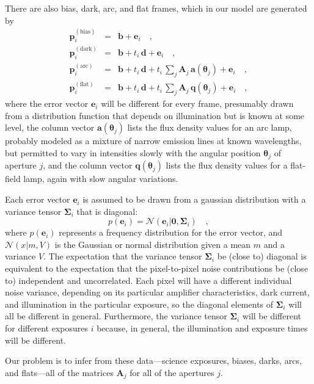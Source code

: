 \documentclass[12pt]{article}
\newcommand{\hmatrix}[1]{\boldsymbol{#1}}
\newcommand{\Amatrix}{\hmatrix{A}}
\newcommand{\zero}{\hmatrix{0}}
\newcommand{\biaspixels}{\hmatrix{p}^\mathrm{(bias)}}
\newcommand{\darkpixels}{\hmatrix{p}^\mathrm{(dark)}}
\newcommand{\arcpixels}{\hmatrix{p}^\mathrm{(arc)}}
\newcommand{\flatpixels}{\hmatrix{p}^\mathrm{(flat)}}
\newcommand{\bias}{\hmatrix{b}}
\newcommand{\dark}{\hmatrix{d}}
\newcommand{\arc}{\hmatrix{a}}
\newcommand{\lamp}{\hmatrix{q}}
\renewcommand{\angle}{\hmatrix{\theta}}
\newcommand{\error}{\hmatrix{e}}
\newcommand{\pixelvariance}{\hmatrix{\Sigma}}
\newcommand{\Normal}{\mathscr{N}}
\newcommand{\exptime}{t}
\begin{document}
There are also bias, dark, arc, and flat frames, which in our model
are generated by
\begin{eqnarray}\displaystyle
\biaspixels_i & = & \bias 
                + \error_i \quad ,\\
\darkpixels_i & = & \bias + \exptime_i\,\dark
                + \error_i \quad ,\\
\arcpixels_i  & = & \bias + \exptime_i\,\dark
                + \exptime_i\,\sum_j \Amatrix_j\,\arc(\angle_j)
                + \error_i \quad ,\\
\flatpixels_i & = & \bias + \exptime_i\,\dark
                + \exptime_i\,\sum_j \Amatrix_j\,\lamp(\angle_j)
                + \error_i \quad ,
\end{eqnarray}
where the error vector $\error_i$ will be different for every frame,
presumably drawn from a distribution function that depends on
illumination but is known at some level, the column vector
$\arc(\angle_j)$ lists the flux density values for an arc lamp,
probably modeled as a mixture of narrow emission lines at known
wavelengths, but permitted to vary in intensities slowly with the
angular position $\angle_j$ of aperture $j$, and the column vector
$\lamp(\angle_j)$ lists the flux density values for a flat-field lamp,
again with slow angular variations.

Each error vector $\error_i$ is assumed to be drawn from a gaussian
distribution with a variance tensor $\pixelvariance_i$ that is
diagonal:
\begin{equation}
p(\error_i) =\Normal(\error_i|\zero,\pixelvariance_i) \quad,
\end{equation}
where $p(\error_i)$ represents a frequency distribution for the error
vector, and $\Normal(x|m,V)$ is the Gaussian or normal distribution
given a mean $m$ and a variance $V$.  The expectation that the
variance tensor $\pixelvariance_i$ be (close to) diagonal is
equivalent to the expectation that the pixel-to-pixel noise
contributions be (close to) independent and uncorrelated.  Each pixel
will have a different individual noise variance, depending on its
particular amplifier characteristics, dark current, and illumination
in the particular exposure, so the diagonal elements of
$\pixelvariance_i$ will all be different in general.  Furthermore, the
variance tensor $\pixelvariance_i$ will be different for different
exposures $i$ because, in general, the illumination and exposure times
will be different.

Our problem is to infer from these data---science exposures, biases,
darks, arcs, and flats---all of the matrices $\Amatrix_j$ for all of
the apertures $j$.
\end{document}
